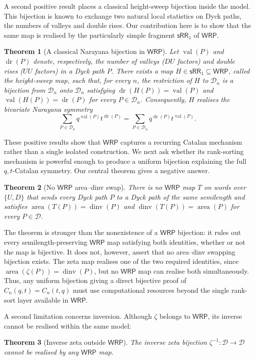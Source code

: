 \documentclass[11pt]{article}
\newtheorem{theorem}{Theorem}[section]
\theoremstyle{definition}
\newcommand{\D}{\mathcal D}
\newcommand{\WRP}{\mathsf{WRP}}
\newcommand{\SWR}{\mathsf{sRR}_1}
\newcommand{\area}{\operatorname{area}}
\newcommand{\dinv}{\operatorname{dinv}}
\newcommand{\val}{\operatorname{val}}
\newcommand{\dr}{\operatorname{dr}}
\begin{document}
A second positive result places a classical height-sweep bijection inside the
model.  This bijection is known to exchange two natural local statistics on
Dyck paths, the numbers of valleys and double rises.  Our contribution here is
to show that the same map is realised by the particularly simple fragment
$\SWR$ of $\WRP$.
\begin{theorem}[A classical Narayana bijection in $\WRP$]
\label{thm:intro-narayana-sweep}
Let $\val(P)$ and $\dr(P)$ denote, respectively, the number of valleys
($DU$ factors) and double rises ($UU$ factors) in a Dyck path $P$.
There exists a map $H\in\SWR\subseteq\WRP$, called the \emph{height-sweep
map}, such that, for every $n$, the restriction of $H$ to $\D_n$ is a
bijection from $\D_n$ onto $\D_n$ satisfying
$\dr(H(P))=\val(P)$ and $\val(H(P))=\dr(P)$ for every
$P\in\D_n$.
Consequently, $H$ realises the bivariate Narayana
symmetry
\[
   \sum_{P\in\D_n} q^{\val(P)}t^{\dr(P)}
   =
   \sum_{P\in\D_n} q^{\dr(P)}t^{\val(P)}.
\]
\end{theorem}

These positive results show that $\WRP$ captures a recurring Catalan mechanism
rather than a single isolated construction.  We next ask whether its
rank-sorting mechanism is powerful enough to produce a uniform bijection
explaining the full $q,t$-Catalan symmetry.  Our central theorem gives a
negative answer.
\begin{theorem}[No $\WRP$ area--dinv swap]
\label{thm:intro-no-swap}
There is no $\WRP$ map $T$ on words over $\{U,D\}$ that sends every Dyck path
$P$ to a Dyck path of the same semilength and satisfies
$\area(T(P))=\dinv(P)$ and $\dinv(T(P))=\area(P)$ for every $P\in\D$.
\end{theorem}

The theorem is stronger than the nonexistence of a $\WRP$ bijection: it rules
out every semilength-preserving $\WRP$ map satisfying both identities, whether
or not the map is bijective.  It does not, however, assert that no
area--dinv swapping bijection exists.  The zeta map realises one of the two
required identities, since $\area(\zeta(P))=\dinv(P)$, but no $\WRP$ map can
realise both simultaneously.  Thus, any uniform bijection giving a direct
bijective proof of $C_n(q,t)=C_n(t,q)$ must use computational resources beyond
the single rank-sort layer available in $\WRP$.

A second limitation concerns inversion.  Although $\zeta$ belongs to $\WRP$,
its inverse cannot be realised within the same model:
\begin{theorem}[Inverse zeta outside $\WRP$]
\label{thm:intro-inverse-zeta}
The inverse zeta bijection $\zeta^{-1}\colon\D\to\D$ cannot be realised by any
$\WRP$ map.
\end{theorem}
\end{document}
